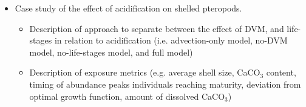 \begin{itemize}
    
    \item Case study of the effect of acidification on shelled pteropods.
    \begin{itemize}
        \item Description of approach to separate between the effect of DVM, and life-stages in relation to acidification (i.e. advection-only model, no-DVM model, no-life-stages model, and full model)
        
        \item Description of exposure metrics (e.g. average shell size, CaCO$_3$ content, timing of abundance peaks individuals reaching maturity, deviation from optimal growth function, amount of dissolved CaCO$_3$)
    \end{itemize}
    
    
\end{itemize}